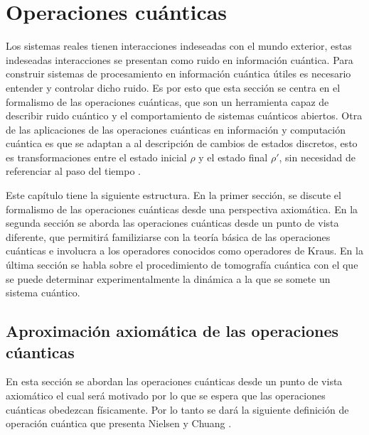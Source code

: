 \chapter{Operaciones cuánticas}\label{OpCuanticas}


Los sistemas reales tienen interacciones indeseadas con el mundo exterior, estas indeseadas interacciones se presentan como ruido en información cuántica. Para construir sistemas de procesamiento en información cuántica útiles es necesario entender y controlar dicho ruido. Es por esto que esta sección se centra en el formalismo de las operaciones cuánticas, que son un herramienta capaz de describir ruido cuántico y el comportamiento de sistemas cuánticos abiertos. Otra de las aplicaciones de las operaciones cuánticas en información y computación cuántica  es que se adaptan a al descripción de cambios de estados discretos, esto es transformaciones entre el estado inicial $\rho$ y el estado final $\rho'$, sin necesidad de referenciar al paso del tiempo {\cite{nielsen_chuang_2010}}.


Este capítulo tiene la siguiente estructura. En la primer sección, se discute el formalismo de las operaciones cuánticas desde una perspectiva axiomática. En la segunda sección se aborda las operaciones cuánticas desde un punto de vista diferente, que permitirá familiziarse con la teoría básica de las operaciones cuánticas e involucra a los operadores conocidos como operadores de Kraus. En la última sección se habla sobre el procedimiento de tomografía cuántica con el que se puede determinar experimentalmente la dinámica a la que se somete un sistema cuántico.%

\section{Aproximación axiomática de las operaciones cúanticas}
En esta sección se abordan las operaciones cuánticas desde un punto de vista axiomático el cual será motivado por lo que se espera que las operaciones cuánticas obedezcan físicamente. Por lo tanto se dará la siguiente definición de operación cuántica que presenta Nielsen y Chuang {\cite{nielsen_chuang_2010}}.




